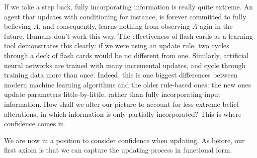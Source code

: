 \documentclass{article}
\def\cofunc{commitment function}
\def\confdom{\mathdcal C}
\begin{document}
If we take a step back, fully incorporating information is really quite extreme. 
An agent that updates with conditioning for instance, is forever committed to fully believing $A$, and consequently, learns nothing from observing $A$ agin in the future. 
Humans don't work this way. 
The effectiveness of flash cards as a learning tool demonstrates this clearly:
if we were using an update rule, two cycles through a deck of flash cards would be no different from one.
Similarly, artificial neural networks are trained with many incremental updates, and cycle through training data more than once.
Indeed, this is one biggest differences between modern machine learning algorithms and the older rule-based ones: the new ones update parameters little-by-little, rather than fully incorporating input information.
How shall we alter our picture to account for less extreme belief alterations, in which information is only partially incorporated?
This is where confidence comes in. 




We are now in a position to consider confidence when updating. 
As before, our first axiom is that we can capture the updating process in functional form. 

\end{document}
